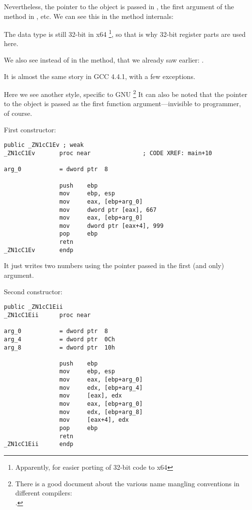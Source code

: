 Nevertheless, the \ITthis pointer to the object is passed in \RCX, the first argument of the method in \RDX, etc.
We can see this in the 
 method internals:



The \Tint data type is still 32-bit in x64
\footnote{Apparently, for easier porting of 32-bit \CCpp code to x64}, 
so that is why 32-bit register parts are used here.

We also see  instead of \RET in the  method, that  we already saw
earlier: .


It is almost the same story in GCC 4.4.1, with a few exceptions.



Here we see another  style, specific to GNU
\footnote{There is a good document about the various name mangling conventions in different compilers:\\
\InSqBrackets{\AgnerFogCC}.}
It can also be noted that the pointer to the object is passed as the first function 
argument---invisible to programmer, of course.

First constructor:

\begin{lstlisting}[style=customasm]
                public _ZN1cC1Ev ; weak
_ZN1cC1Ev       proc near               ; CODE XREF: main+10

arg_0           = dword ptr  8

                push    ebp
                mov     ebp, esp
                mov     eax, [ebp+arg_0]
                mov     dword ptr [eax], 667
                mov     eax, [ebp+arg_0]
                mov     dword ptr [eax+4], 999
                pop     ebp
                retn
_ZN1cC1Ev       endp
\end{lstlisting}

It just writes two numbers using the pointer passed in the first (and only) argument.

Second constructor:

\begin{lstlisting}[style=customasm]
                public _ZN1cC1Eii
_ZN1cC1Eii      proc near

arg_0           = dword ptr  8
arg_4           = dword ptr  0Ch
arg_8           = dword ptr  10h

                push    ebp
                mov     ebp, esp
                mov     eax, [ebp+arg_0]
                mov     edx, [ebp+arg_4]
                mov     [eax], edx
                mov     eax, [ebp+arg_0]
                mov     edx, [ebp+arg_8]
                mov     [eax+4], edx
                pop     ebp
                retn
_ZN1cC1Eii      endp
\end{lstlisting}

